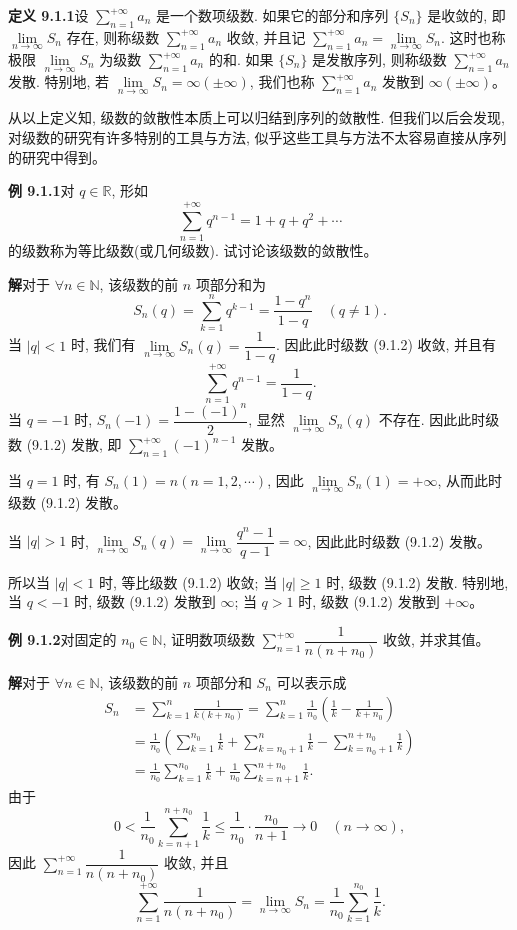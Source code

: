 \documentclass[UTF8,12pt,a4paper,fontset=fandol]{ctexart}
\begin{document}
\noindent\textbf{定义 9.1.1}\quad 设 $\sum\limits_{n=1}^{+\infty}a_n$ 是一个数项级数. 如果它的部分和序列 $\{S_n\}$ 是收敛的, 即 $\lim\limits_{n\to\infty}S_n$ 存在, 则称级数 $\sum\limits_{n=1}^{+\infty}a_n$ 收敛, 并且记 $\sum\limits_{n=1}^{+\infty}a_n=\lim\limits_{n\to\infty}S_n$. 这时也称极限 $\lim\limits_{n\to\infty}S_n$ 为级数 $\sum\limits_{n=1}^{+\infty}a_n$ 的和. 如果 $\{S_n\}$ 是发散序列, 则称级数 $\sum\limits_{n=1}^{+\infty}a_n$ 发散. 特别地, 若 $\lim\limits_{n\to\infty}S_n=\infty(\pm\infty)$, 我们也称 $\sum\limits_{n=1}^{+\infty}a_n$ 发散到 $\infty(\pm\infty)$。

从以上定义知, 级数的敛散性本质上可以归结到序列的敛散性. 但我们以后会发现, 对级数的研究有许多特别的工具与方法, 似乎这些工具与方法不太容易直接从序列的研究中得到。

\noindent\textbf{例 9.1.1}\quad 对 $q\in\mathbb R$, 形如
\begin{equation}
  \sum_{n=1}^{+\infty}q^{n-1}=1+q+q^2+\cdots
  \tag{9.1.2}
\end{equation}
的级数称为等比级数(或几何级数). 试讨论该级数的敛散性。

\noindent\textbf{解}\quad 对于 $\forall n\in\mathbb N$, 该级数的前 $n$ 项部分和为
\[
  S_n(q)=\sum_{k=1}^n q^{k-1}=\frac{1-q^n}{1-q}\quad(q\neq1).
\]
当 $|q|<1$ 时, 我们有 $\lim\limits_{n\to\infty}S_n(q)=\dfrac1{1-q}$. 因此此时级数 (9.1.2) 收敛, 并且有
\[
  \sum_{n=1}^{+\infty}q^{n-1}=\frac1{1-q}.
\]
当 $q=-1$ 时, $S_n(-1)=\dfrac{1-(-1)^n}{2}$, 显然 $\lim\limits_{n\to\infty}S_n(q)$ 不存在. 因此此时级数 (9.1.2) 发散, 即 $\sum\limits_{n=1}^{+\infty}(-1)^{n-1}$ 发散。

当 $q=1$ 时, 有 $S_n(1)=n(n=1,2,\cdots)$, 因此 $\lim\limits_{n\to\infty}S_n(1)=+\infty$, 从而此时级数 (9.1.2) 发散。

当 $|q|>1$ 时, $\lim\limits_{n\to\infty}S_n(q)=\lim\limits_{n\to\infty}\dfrac{q^n-1}{q-1}=\infty$, 因此此时级数 (9.1.2) 发散。

所以当 $|q|<1$ 时, 等比级数 (9.1.2) 收敛; 当 $|q|\geq1$ 时, 级数 (9.1.2) 发散. 特别地, 当 $q<-1$ 时, 级数 (9.1.2) 发散到 $\infty$; 当 $q>1$ 时, 级数 (9.1.2) 发散到 $+\infty$。

\noindent\textbf{例 9.1.2}\quad 对固定的 $n_0\in\mathbb N$, 证明数项级数 $\sum\limits_{n=1}^{+\infty}\dfrac1{n(n+n_0)}$ 收敛, 并求其值。

\noindent\textbf{解}\quad 对于 $\forall n\in\mathbb N$, 该级数的前 $n$ 项部分和 $S_n$ 可以表示成
\[
\begin{aligned}
  S_n
  &=\sum_{k=1}^n\frac1{k(k+n_0)}
    =\sum_{k=1}^n\frac1{n_0}\left(\frac1k-\frac1{k+n_0}\right)\\
  &=\frac1{n_0}\left(\sum_{k=1}^{n_0}\frac1k+\sum_{k=n_0+1}^n\frac1k-\sum_{k=n_0+1}^{n+n_0}\frac1k\right)\\
  &=\frac1{n_0}\sum_{k=1}^{n_0}\frac1k+\frac1{n_0}\sum_{k=n+1}^{n+n_0}\frac1k.
\end{aligned}
\]
由于
\[
  0<\frac1{n_0}\sum_{k=n+1}^{n+n_0}\frac1k\leq \frac1{n_0}\cdot\frac{n_0}{n+1}\to0\quad(n\to\infty),
\]
因此 $\sum\limits_{n=1}^{+\infty}\dfrac1{n(n+n_0)}$ 收敛, 并且
\[
  \sum_{n=1}^{+\infty}\frac1{n(n+n_0)}
  =\lim_{n\to\infty}S_n=\frac1{n_0}\sum_{k=1}^{n_0}\frac1k.
\]
\end{document}
